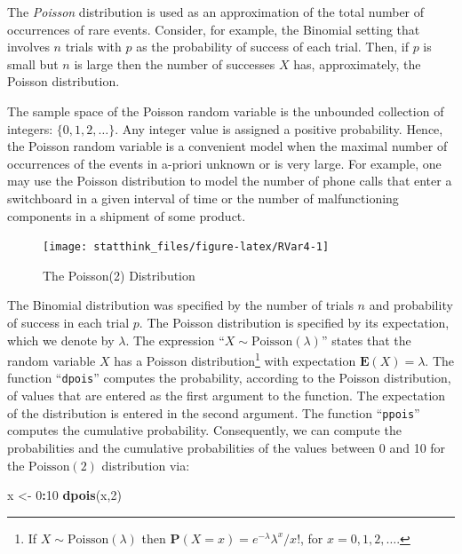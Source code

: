 \documentclass[
]{krantz}
\makeatletter
\newenvironment{Shaded}{\begin{snugshade}}{\end{snugshade}}
\newcommand{\DecValTok}[1]{\textcolor[rgb]{0.00,0.00,0.81}{#1}}
\newcommand{\KeywordTok}[1]{\textcolor[rgb]{0.13,0.29,0.53}{\textbf{#1}}}
\newcommand{\NormalTok}[1]{#1}
\newcommand{\OperatorTok}[1]{\textcolor[rgb]{0.81,0.36,0.00}{\textbf{#1}}}
\newcommand{\StringTok}[1]{\textcolor[rgb]{0.31,0.60,0.02}{#1}}
\newcommand{\Expec}{\mathbf{E}}
\newcommand{\Prob}{\mathbf{P}}
\newenvironment{kframe}{%
\medskip{}
\setlength{\fboxsep}{.8em}
 \def\at@end@of@kframe{}%
 \ifinner\ifhmode%
  \def\at@end@of@kframe{\end{minipage}}%
  \begin{minipage}{\columnwidth}%
 \fi\fi%
 \def\FrameCommand##1{\hskip\@totalleftmargin \hskip-\fboxsep
 \colorbox{shadecolor}{##1}\hskip-\fboxsep
     \hskip-\linewidth \hskip-\@totalleftmargin \hskip\columnwidth}%
 \MakeFramed {\advance\hsize-\width
   \@totalleftmargin\z@ \linewidth\hsize
   \@setminipage}}%
 {\par\unskip\endMakeFramed%
 \at@end@of@kframe}
\renewenvironment{Shaded}{\begin{kframe}}{\end{kframe}}
\theoremstyle{definition}
\theoremstyle{definition}
\theoremstyle{definition}
\theoremstyle{remark}
\makeatother
\begin{document}
The \emph{Poisson} distribution is used as an approximation of the total
number of occurrences of rare events. Consider, for example, the
Binomial setting that involves \(n\) trials with \(p\) as the probability of
success of each trial. Then, if \(p\) is small but \(n\) is large then the
number of successes \(X\) has, approximately, the Poisson distribution.

The sample space of the Poisson random variable is the unbounded
collection of integers: \(\{0,1,2, \ldots\}\). Any integer value is
assigned a positive probability. Hence, the Poisson random variable is a
convenient model when the maximal number of occurrences of the events in
a-priori unknown or is very large. For example, one may use the Poisson
distribution to model the number of phone calls that enter a switchboard
in a given interval of time or the number of malfunctioning components
in a shipment of some product.

\begin{figure}

{\centering \texttt{[image: statthink\_files/figure-latex/RVar4-1]} 

}

\caption{The Poisson(2) Distribution}\label{fig:RVar4}
\end{figure}

The Binomial distribution was specified by the number of trials \(n\) and
probability of success in each trial \(p\). The Poisson distribution is
specified by its expectation, which we denote by \(\lambda\). The
expression ``\(X \sim \mathrm{Poisson}(\lambda)\)'' states that the random
variable \(X\) has a Poisson distribution\footnote{If \(X \sim \mathrm{Poisson}(\lambda)\) then
  \(\Prob(X=x) = e^{-\lambda}\lambda^x/x!\), for \(x=0,1,2,\ldots\).} with expectation
\(\Expec(X) = \lambda\). The function ``\texttt{dpois}'' computes the probability,
according to the Poisson distribution, of values that are entered as the
first argument to the function. The expectation of the distribution is
entered in the second argument. The function ``\texttt{ppois}'' computes the
cumulative probability. Consequently, we can compute the probabilities
and the cumulative probabilities of the values between 0 and 10 for the
\(\mathrm{Poisson}(2)\) distribution via:

\begin{Shaded}
\begin{Highlighting}[]
\NormalTok{x <-}\StringTok{ }\DecValTok{0}\OperatorTok{:}\DecValTok{10}
\KeywordTok{dpois}\NormalTok{(x,}\DecValTok{2}\NormalTok{)}
\end{Highlighting}
\end{Shaded}
\end{document}
